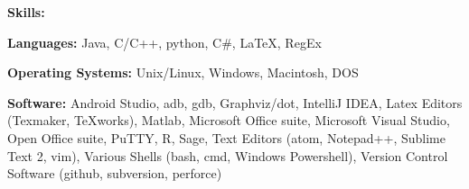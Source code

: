 {\large \noindent
\textbf{Skills:}}

{\indent
\textbf{Languages:} Java, C/C++, python, C\#, \LaTeX, RegEx}

{\indent
\textbf{Operating Systems:} Unix/Linux, Windows, Macintosh, DOS}

{\indent
\textbf{Software:} Android Studio, adb, gdb, Graphviz/dot, IntelliJ IDEA, Latex Editors (Texmaker, TeXworks), Matlab, Microsoft Office suite, Microsoft Visual Studio, Open Office suite, PuTTY, R, Sage, Text Editors (atom, Notepad++, Sublime Text 2, vim), Various Shells (bash, cmd, Windows Powershell), Version Control Software (github, subversion, perforce)}
\begin{comment}
{\indent
\textbf{Foreign Language:}}
\end{comment}

\begin{comment}
Visual Basic, SQL, Scheme, Mathematica, php, TI basic, POSIX, IA32 Assembly
\end{comment}